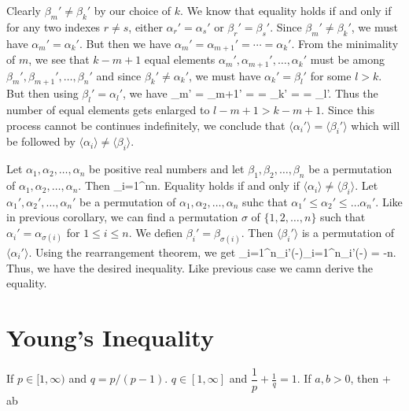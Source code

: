   Clearly $\beta_m'\neq\beta_k'$ by our choice of $k$. We know that equality holds if and only if for any two indexes $r\neq s$,
  either $\alpha_r' = \alpha_s'$ or $\beta_r' = \beta_s'$. Since $\beta_m'\neq\beta_k'$, we must have $\alpha_m' = \alpha_k'$. But
  then we have $\alpha_m' = \alpha_{m+1}' = \cdots = \alpha_k'$. From the minimality of $m$, we see that $k - m + 1$ equal elements
  $\alpha_m', \alpha_{m+1}', \ldots, \alpha_k'$ must be among $\beta_m', \beta_{m+1}', \ldots, \beta_n'$ and since
  $\beta_k'\neq\alpha_k'$, we must have $\alpha_k' = \beta_l'$ for some $l > k$. But then using $\beta_l' = \alpha_l'$, we have
  \startformula \alpha_m' = \alpha_{m+1}' = \cdots = \alpha_k' = \cdots = \alpha_l'.\stopformula
  Thus the number of equal elements gets enlarged to $l - m + 1 > k -m + 1$. Since this process cannot be continues indefinitely,
  we conclude that $\langle\alpha_i'\rangle = \langle\beta_i'\rangle$ which will be followed
  by $\langle\alpha_i\rangle\neq\langle\beta_i\rangle$.
\stopproof

\startcorollary
  Let $\alpha_1, \alpha_2, \ldots, \alpha_n$ be positive real numbers and let $\beta_1, \beta_2, \ldots, \beta_n$ be a permutation
  of $\alpha_1, \alpha_2, \ldots, \alpha_n$. Then \startformula \sum_{i=1}^n\geq n.\stopformula
  Equality holds if and only if $\langle\alpha_i\rangle\neq\langle\beta_i\rangle$.
\stopcorollary
\startproof
  Let $\alpha_1', \alpha_2', \ldots, \alpha_n'$ be a permutation of $\alpha_1, \alpha_2, \ldots, \alpha_n$ suhc that
  $\alpha_1'\leq\alpha_2'\leq\ldots\alpha_n'$. Like in previous corollary, we can find a permutation $\sigma$ of $\{1,2,\ldots,
  n\}$ such that $\alpha_i' = \alpha_{\sigma(i)}$ for $1\leq i\leq n$. We defien $\beta_i' = \beta_{\sigma(i)}$. Then
  $\langle\beta_i'\rangle$ is a permutation of $\langle\alpha_i'\rangle$. Using the rearrangement theorem, we get
  \startformula \sum_{i=1}^n\beta_i'\left(-\right)\leq\sum_{i=1}^n\alpha_i'\left(-\right) = -n.\stopformula
  Thus, we have the desired inequality. Like previous case we camn derive the equality.
\stopproof

\section{Young's Inequality}
\starttheorem
  If $p\in [1,\infty)$ and $q = p/(p - 1)$. $q\in [1, \infty]$ and $\dfrac{1}{p} + \frac{1}{q} = 1$. If $a, b > 0$,
    then
    \placeformula\startformula
       + \geq ab
    \stopformula
\stoptheorem

